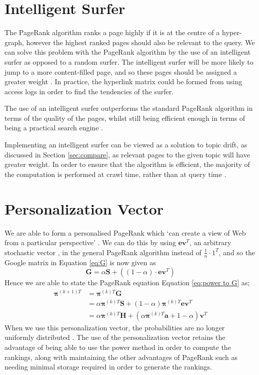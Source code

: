 \documentclass[11pt]{report}
\begin{document}
\section{Intelligent Surfer} \label{sec:intelligent}

The PageRank algorithm ranks a page highly if it is at the centre of a hyper-graph, however the highest ranked pages should also be relevant to the query. We can solve this problem with the PageRank algorithm by the use of an intelligent surfer as opposed to a random surfer. The intelligent surfer will be more likely to jump to a more content-filled page, and so these pages should be assigned a greater weight \cite{langville}. In practice, the hyperlink matrix could be formed from using access logs in order to find the tendencies of the surfer. 

The use of an intelligent surfer outperforms the standard PageRank algorithm in terms of the quality of the pages, whilst still being efficient enough in terms of being a practical search engine \cite{richardson2002intelligent}. 

Implementing an intelligent surfer can be viewed as a solution to topic drift, as discussed in Section \ref{sec:compare}, as relevant pages to the given topic will have greater weight. In order to ensure that the algorithm is efficient, the majority of the computation is performed at crawl time, rather than at query time \cite{richardson2002intelligent}. 

\section{Personalization Vector} \label{sec:Personalization}

We are able to form a personalised PageRank which `can create a view of Web from a particular perspective' \cite{page1999pagerank}. We can do this by using $\textbf{ev}^T$, an arbitrary stochastic vector \cite{bonato}, in the general PageRank algorithm instead of $\frac{1}{n}\cdot1^T$, and so the Google matrix in Equation \eqref{eq:G} is now given as 
\begin{equation*}\label{eq:Personalisation G}
\textbf{G}=\alpha\textbf{S}+\left((1-\alpha)\cdot\textbf{ev}^T\right)
\end{equation*} 
Hence we are able to state the PageRank equation Equation \eqref{eq:power to G} as; 
\begin{align*}
\boldsymbol{\pi}^{(k+1)T} &= \boldsymbol{\pi}^{(k)T}\textbf{G} \nonumber \\
&= \alpha\boldsymbol{\pi}^{(k)T}\textbf{S} + (1-\alpha)\boldsymbol{\pi}^{(k)T}\textbf{ev}^T \nonumber \\
&= \alpha\boldsymbol{\pi}^{(k)T}\textbf{H} + \left(\alpha\boldsymbol{\pi}^{(k)T}\textbf{a} + 1 - \alpha\right)\textbf{v}^T \label{eq:Power personalization}
\end{align*}
When we use this personalization vector, the probabilities are no longer uniformly distributed \cite{langville}. The use of the personalization vector retains the advantage of being able to use the power method in order to compute the rankings, along with maintaining the other advantages of PageRank such as needing minimal storage required in order to generate the rankings.
\end{document}
